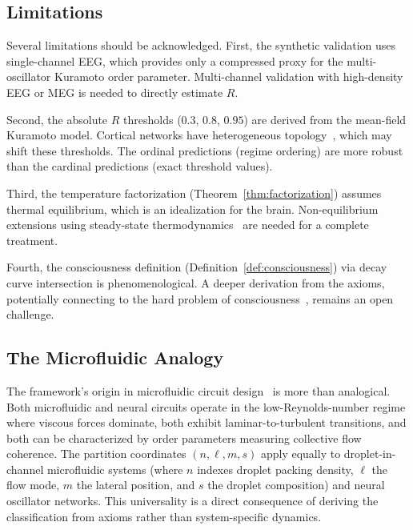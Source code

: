 \documentclass[aps,prd,twocolumn,superscriptaddress,floatfix,nofootinbib]{revtex4-2}
\theoremstyle{remark}
\newcommand{\Rorder}{R}
\begin{document}
\subsection{Limitations}

Several limitations should be acknowledged. First, the synthetic validation uses single-channel EEG, which provides only a compressed proxy for the multi-oscillator Kuramoto order parameter. Multi-channel validation with high-density EEG or MEG is needed to directly estimate $\Rorder$.

Second, the absolute $\Rorder$ thresholds ($0.3$, $0.8$, $0.95$) are derived from the mean-field Kuramoto model. Cortical networks have heterogeneous topology~\cite{bullmore2009complex,sporns2005human}, which may shift these thresholds. The ordinal predictions (regime ordering) are more robust than the cardinal predictions (exact threshold values).

Third, the temperature factorization (Theorem~\ref{thm:factorization}) assumes thermal equilibrium, which is an idealization for the brain. Non-equilibrium extensions using steady-state thermodynamics~\cite{landau1980statistical} are needed for a complete treatment.

Fourth, the consciousness definition (Definition~\ref{def:consciousness}) via decay curve intersection is phenomenological. A deeper derivation from the axioms, potentially connecting to the hard problem of consciousness~\cite{chalmers1996conscious}, remains an open challenge.

\subsection{The Microfluidic Analogy}

The framework's origin in microfluidic circuit design~\cite{whitesides2006origins,stone2004engineering,squires2005microfluidics} is more than analogical. Both microfluidic and neural circuits operate in the low-Reynolds-number regime where viscous forces dominate, both exhibit laminar-to-turbulent transitions, and both can be characterized by order parameters measuring collective flow coherence. The partition coordinates $(n, \ell, m, s)$ apply equally to droplet-in-channel microfluidic systems (where $n$ indexes droplet packing density, $\ell$ the flow mode, $m$ the lateral position, and $s$ the droplet composition) and neural oscillator networks. This universality is a direct consequence of deriving the classification from axioms rather than system-specific dynamics.
\end{document}
